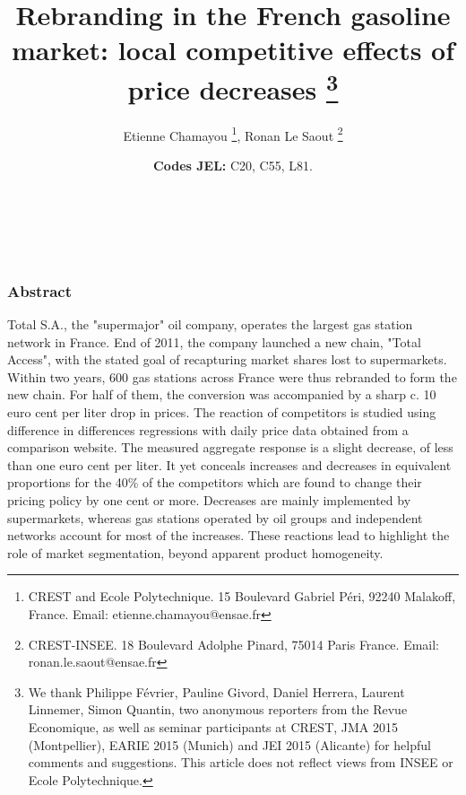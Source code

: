 \documentclass[english]{article}
\begin{document}
\title{Rebranding in the French gasoline market: local competitive effects
of price decreases%
\thanks{We thank Philippe Février, Pauline Givord, Daniel Herrera, Laurent
Linnemer, Simon Quantin, two anonymous reporters from the Revue Economique,
as well as seminar participants at CREST, JMA 2015 (Montpellier),
EARIE 2015 (Munich) and JEI 2015 (Alicante) for helpful comments and suggestions.
This article does not reflect views from INSEE or Ecole Polytechnique.%
}}


\author{Etienne Chamayou%
\thanks{CREST and Ecole Polytechnique. 15 Boulevard Gabriel Péri, 92240 Malakoff, France.
Email: etienne.chamayou@ensae.fr%
}, Ronan Le Saout%
\thanks{CREST-INSEE. 18 Boulevard Adolphe Pinard, 75014 Paris France. Email: ronan.le.saout@ensae.fr%
}}

\maketitle
\vspace{-1cm}
\ \\
\ \\
\subsubsection*{Abstract}

Total S.A., the "supermajor" oil company, operates the largest gas station network in France. End of 2011, the company launched a new chain, "Total Access", with the stated goal of recapturing market shares lost to supermarkets. Within two years, 600 gas stations across France were thus rebranded to form the new chain. For half of them, the conversion was accompanied by a sharp c. 10 euro cent per liter drop in prices. The reaction of competitors is studied using difference in differences regressions with daily price data obtained from a comparison website. The measured aggregate response is a slight decrease, of less than one euro cent per liter. It yet conceals increases and decreases in equivalent proportions for the 40\% of the competitors which are found to change their pricing policy by one cent or more. Decreases are mainly implemented by supermarkets, whereas gas stations operated by oil groups and independent networks account for most of the increases. These reactions lead to highlight the role of market segmentation, beyond apparent product homogeneity.

\medskip{}

\date{\noindent \textbf{Codes JEL:} C20, C55, L81.}
\end{document}
